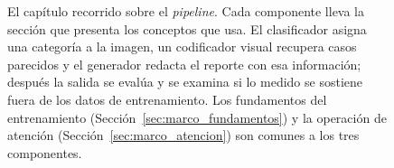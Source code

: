 \begin{figure}[htbp]
    \caption[El capítulo recorrido sobre el \emph{pipeline}]{El capítulo recorrido sobre el
    \emph{pipeline}. Cada componente lleva la sección que presenta los conceptos que usa. El clasificador
    asigna una categoría a la imagen, un codificador visual recupera casos parecidos y el generador redacta
    el reporte con esa información; después la salida se evalúa y se examina si lo medido se sostiene
    fuera de los datos de entrenamiento. Los fundamentos del entrenamiento
    (Sección~\ref{sec:marco_fundamentos}) y la operación de atención (Sección~\ref{sec:marco_atencion}) son
    comunes a los tres componentes.}
    \label{fig:marco_mapa}
\end{figure}
